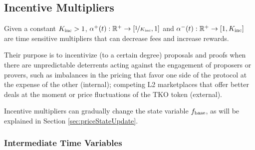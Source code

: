 \documentclass[9pt,oneside]{amsart}
\begin{document}
\begin{multicols}{2}
    


\subsection{Incentive Multipliers}
\label{sec:incentive_mult}
Given a constant $K_\textnormal{inc} > 1$, 
$\alpha^+(t): \mathbb{R}^+\rightarrow [ \nicefrac{1}{K_\textnormal{inc}},1]$ and $\alpha^-(t): \mathbb{R}^+\rightarrow [1, K_\textnormal{inc}] $ are time sensitive multipliers that can decrease fees and increase rewards. 

Their purpose is to incentivize (to a certain degree) proposals and proofs when there are unpredictable deterrents acting against the engagement of proposers or provers, such as imbalances in the pricing that favor one side of the protocol at the expense of the other (internal);  competing L2 marketplaces that offer better deals at the moment or price fluctuations of the TKO token (external).

Incentive multipliers can gradually change the state variable $f_\textnormal{base}$, as will be explained in Section \ref{sec:priceStateUpdate}.

\subsubsection{Intermediate Time Variables} 
\label{sec:intermediateTimeVar}


\end{multicols}
\end{document}
